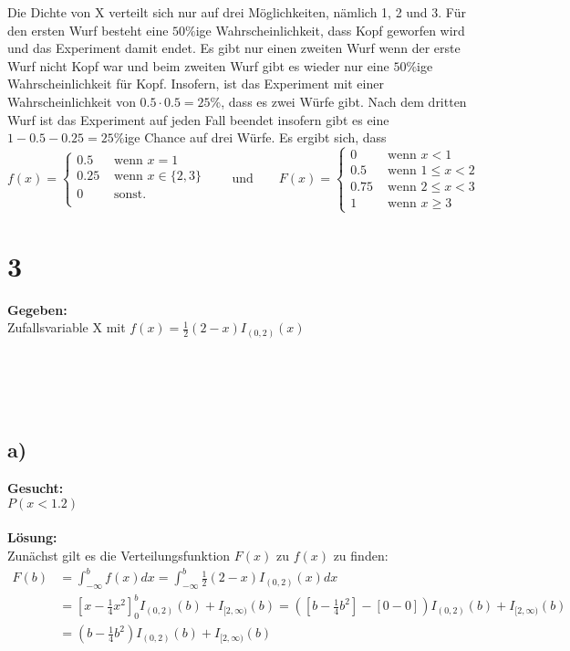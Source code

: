 \documentclass{article}
\begin{document}
Die Dichte von X verteilt sich nur auf drei Möglichkeiten, nämlich 1, 2 und 3. Für den ersten Wurf besteht eine $50$\%ige Wahrscheinlichkeit, dass Kopf geworfen wird und das Experiment damit endet. Es gibt nur einen zweiten Wurf wenn der erste Wurf nicht Kopf war und beim zweiten Wurf gibt es wieder nur eine $50$\%ige Wahrscheinlichkeit für Kopf. Insofern, ist das Experiment mit einer Wahrscheinlichkeit von $0.5\cdot0.5=25$\%, dass es zwei Würfe gibt. Nach dem dritten Wurf ist das Experiment auf jeden Fall beendet insofern gibt es eine $1 -0.5 -0.25 = 25$\%ige Chance auf drei Würfe. Es ergibt sich, dass 
\[  f(x) =\begin{cases}
            0.5& \text{ wenn }  x = 1 \\
            0.25 & \text{ wenn } x \in \{2,3\} \\
            0 & \text{ sonst.} \\
        \end{cases}\qquad \text{und} \qquad 
    F(x) =\begin{cases}
            0 & \text{ wenn } x < 1 \\
            0.5 & \text{ wenn } 1 \leq x < 2 \\
            0.75 & \text{ wenn } 2 \leq x < 3 \\
            1 & \text{ wenn } x \geq 3
    \end{cases}\] 

\section*{3}
\textbf{Gegeben:} \\

Zufallsvariable X mit $f(x) = \frac{1}{2}(2-x)I_{(0,2)}(x)$ \\ \\ \\  \\ \\

\subsection*{a)} 
\textbf{Gesucht: } \\

$P(x <1.2)$\\ \\
\textbf{Lösung:} \\

Zunächst gilt es die Verteilungsfunktion $F(x)$ zu $f(x)$ zu finden:
\begin{align*}
    F(b) &= \int_{-\infty}^{b}f(x)dx = \int_{-\infty}^{b}\frac{1}{2}(2-x)I_{(0,2)}(x)dx\\
    &= [x-\frac{1}{4}x^{2}]_{0}^{b}I_{(0,2)}(b) + I_{[2,\infty)}(b) = ([b-\frac{1}{4}b^{2}] -[0- 0])I_{(0,2)}(b) + I_{[2,\infty)}(b)\\ 
    &= (b-\frac{1}{4}b^{2})I_{(0,2)}(b) + I_{[2,\infty)}(b)
\end{align*}  
\end{document}
